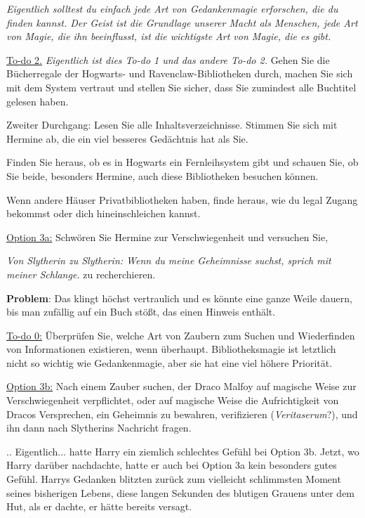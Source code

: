 \emph{Eigentlich solltest du einfach jede Art von Gedankenmagie erforschen, die
du finden kannst. Der Geist ist die Grundlage unserer Macht als Menschen, jede
Art von Magie, die ihn beeinflusst, ist die wichtigste Art von Magie, die es
gibt.}

\underline{ To-do 2.}
\emph{Eigentlich ist dies To-do 1 und das andere To-do 2. } Gehen Sie die
Bücherregale der Hogwarts- und Ravenclaw-Bibliotheken durch, machen Sie sich mit
dem System vertraut und stellen Sie sicher, dass Sie zumindest alle Buchtitel
gelesen haben.

Zweiter Durchgang: Lesen Sie alle Inhaltsverzeichnisse. Stimmen Sie sich mit
Hermine ab, die ein viel besseres Gedächtnis hat als Sie.

Finden Sie heraus, ob es in Hogwarts ein Fernleihsystem gibt und schauen Sie, ob
Sie beide, besonders Hermine, auch diese Bibliotheken besuchen können.

Wenn andere Häuser Privatbibliotheken haben, finde heraus, wie du legal Zugang
bekommst oder dich hineinschleichen kannst.

\underline{Option 3a:}
Schwören Sie Hermine zur Verschwiegenheit und versuchen Sie,

\glqq \emph{Von Slytherin zu Slytherin: Wenn du meine Geheimnisse suchst, sprich
mit meiner Schlange.}\grqq{} zu recherchieren.

\textbf{Problem}: Das klingt höchst vertraulich und es könnte eine ganze Weile
dauern, bis man zufällig auf ein Buch stößt, das einen Hinweis enthält.

\underline{ To-do 0:} Überprüfen Sie, welche Art von Zaubern zum Suchen und
Wiederfinden von Informationen existieren, wenn überhaupt. Bibliotheksmagie ist
letztlich nicht so wichtig wie Gedankenmagie, aber sie hat eine viel höhere
Priorität.

\underline{Option 3b:} Nach einem Zauber suchen, der Draco Malfoy auf magische
Weise zur Verschwiegenheit verpflichtet, oder auf magische Weise die
Aufrichtigkeit von Dracos Versprechen, ein Geheimnis zu bewahren, verifizieren
(\emph{Veritaserum}?), und ihn dann nach Slytherins Nachricht fragen.

.. Eigentlich... hatte Harry ein ziemlich schlechtes Gefühl bei Option 3b.
Jetzt, wo Harry darüber nachdachte, hatte er auch bei Option 3a kein besonders
gutes Gefühl. Harrys Gedanken blitzten zurück zum vielleicht schlimmsten Moment
seines bisherigen Lebens, diese langen Sekunden des blutigen Grauens unter dem
Hut, als er dachte, er hätte bereits versagt.

